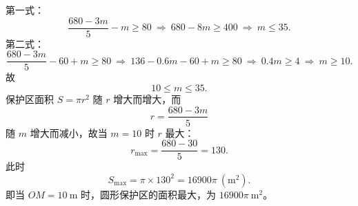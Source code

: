 \begin{answer}
第一式：
\nopagebreak[4]
\[\frac{680-3m}5-m\geqslant80\ \Longrightarrow\ 680-8m\geqslant400\ \Longrightarrow\ m\leqslant35.\]
第二式：
\nopagebreak[4]
\[\frac{680-3m}5-60+m\geqslant80\ \Longrightarrow\ 136-0.6m-60+m\geqslant80\ \Longrightarrow\ 0.4m\geqslant4\ \Longrightarrow\ m\geqslant10.\]
故
\nopagebreak[4]
\[10\leqslant m\leqslant35.\]
保护区面积 $S=\pi r^2$ 随 $r$ 增大而增大，而
\nopagebreak[4]
\[r=\frac{680-3m}5\]
随 $m$ 增大而减小，故当 $m=10$ 时 $r$ 最大：
\nopagebreak[4]
\[r_{\max}=\frac{680-30}5=130.\]
此时
\nopagebreak[4]
\[S_{\max}=\pi\times130^2=16900\pi\ \left(\mathrm m^2\right).\]
即当 $OM=10\ \mathrm m$ 时，圆形保护区的面积最大，为 $16900\pi\ \mathrm m^2$。



\end{answer}
